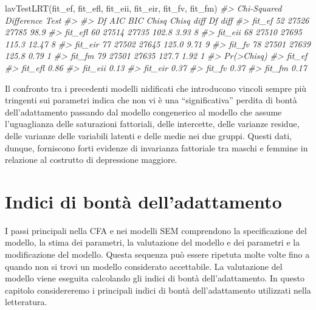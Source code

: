 \documentclass[
  11pt,
]{krantz}
\makeatletter
\newenvironment{Shaded}{\begin{snugshade}}{\end{snugshade}}
\newcommand{\CommentTok}[1]{\textcolor[rgb]{0.37,0.37,0.37}{\textit{#1}}}
\newcommand{\FunctionTok}[1]{\textcolor[rgb]{0,0,0}{#1}}
\newcommand{\NormalTok}[1]{#1}
\newenvironment{kframe}{%
\medskip{}
\setlength{\fboxsep}{.8em}
 \def\at@end@of@kframe{}%
 \ifinner\ifhmode%
  \def\at@end@of@kframe{\end{minipage}}%
  \begin{minipage}{\columnwidth}%
 \fi\fi%
 \def\FrameCommand##1{\hskip\@totalleftmargin \hskip-\fboxsep
 \colorbox{shadecolor}{##1}\hskip-\fboxsep
     \hskip-\linewidth \hskip-\@totalleftmargin \hskip\columnwidth}%
 \MakeFramed {\advance\hsize-\width
   \@totalleftmargin\z@ \linewidth\hsize
   \@setminipage}}%
 {\par\unskip\endMakeFramed%
 \at@end@of@kframe}
\renewenvironment{Shaded}{\begin{kframe}}{\end{kframe}}
\theoremstyle{definition}
\theoremstyle{definition}
\theoremstyle{definition}
\theoremstyle{definition}
\theoremstyle{remark}
\makeatother
\begin{document}
\begin{Shaded}
\begin{Highlighting}[]
\FunctionTok{lavTestLRT}\NormalTok{(fit\_ef, fit\_efl, fit\_eii, fit\_eir, fit\_fv, fit\_fm)}
\CommentTok{\#\textgreater{} Chi{-}Squared Difference Test}
\CommentTok{\#\textgreater{} }
\CommentTok{\#\textgreater{}         Df   AIC   BIC Chisq Chisq diff Df diff}
\CommentTok{\#\textgreater{} fit\_ef  52 27526 27785  98.9                   }
\CommentTok{\#\textgreater{} fit\_efl 60 27514 27735 102.8       3.93       8}
\CommentTok{\#\textgreater{} fit\_eii 68 27510 27695 115.3      12.47       8}
\CommentTok{\#\textgreater{} fit\_eir 77 27502 27645 125.0       9.71       9}
\CommentTok{\#\textgreater{} fit\_fv  78 27501 27639 125.8       0.79       1}
\CommentTok{\#\textgreater{} fit\_fm  79 27501 27635 127.7       1.92       1}
\CommentTok{\#\textgreater{}         Pr(\textgreater{}Chisq)}
\CommentTok{\#\textgreater{} fit\_ef            }
\CommentTok{\#\textgreater{} fit\_efl       0.86}
\CommentTok{\#\textgreater{} fit\_eii       0.13}
\CommentTok{\#\textgreater{} fit\_eir       0.37}
\CommentTok{\#\textgreater{} fit\_fv        0.37}
\CommentTok{\#\textgreater{} fit\_fm        0.17}
\end{Highlighting}
\end{Shaded}

Il confronto tra i precedenti modelli nidificati che introducono vincoli sempre più tringenti sui parametri indica che non vi è una ``significativa'' perdita di bontà dell'adattamento passando dal modello congenerico al modello che assume l'uguaglianza delle saturazioni fattoriali, delle intercette, delle varianze residue, delle varianze delle variabili latenti e delle medie nei due gruppi. Questi dati, dunque, forniscono forti evidenze di invarianza fattoriale tra maschi e femmine in relazione al costrutto di depressione maggiore.

\hypertarget{ch:gof}{%
\chapter{Indici di bontà dell'adattamento}\label{ch:gof}}

I passi principali nella CFA e nei modelli SEM comprendono la specificazione del modello, la stima dei parametri, la valutazione del modello e dei parametri e la modificazione del modello. Questa sequenza può essere ripetuta molte volte fino a quando non si trovi un modello considerato accettabile. La valutazione del modello viene eseguita calcolando gli indici di bontà dell'adattamento. In questo capitolo considereremo i principali indici di bontà dell'adattamento utilizzati nella letteratura.
\end{document}
